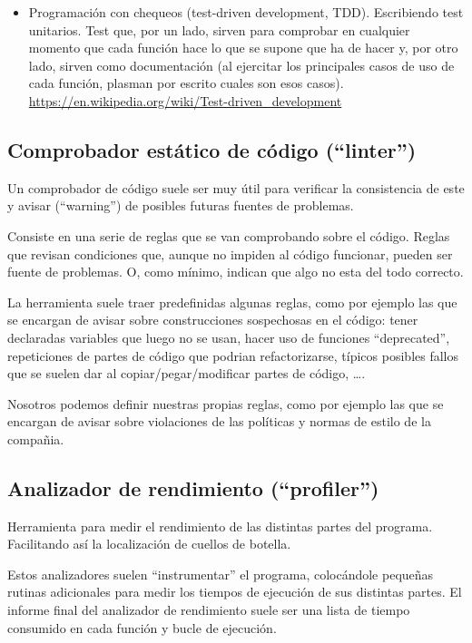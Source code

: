 \documentclass[spanish,12pt,a4paper,final,oneside]{book}
\begin{document}
\begin{itemize}
\item Programación con chequeos (test-driven development, TDD). Escribiendo test unitarios. Test que, por un lado, sirven para comprobar en cualquier momento que cada función hace lo que se supone que ha de hacer y, por otro lado, sirven como documentación (al ejercitar los principales casos de uso de cada función, plasman por escrito cuales son esos casos).
\\ \url{https://en.wikipedia.org/wiki/Test-driven_development}

\end{itemize} 


\subsection{Comprobador estático de código (``linter'')}

Un comprobador de código  suele ser muy útil para verificar la consistencia de este y avisar (``warning'') de posibles futuras fuentes de problemas.

Consiste en una serie de reglas que se van comprobando sobre el código. Reglas que revisan condiciones que, aunque no impiden al código funcionar, pueden ser fuente de problemas. O, como mínimo, indican que algo no esta del todo correcto.

La herramienta suele traer predefinidas algunas reglas, como por ejemplo las que se encargan de avisar sobre construcciones sospechosas en el código: tener declaradas variables que luego no se usan, hacer uso de funciones ``deprecated'', repeticiones de partes de código que podrian refactorizarse, típicos posibles fallos que se suelen dar al copiar/pegar/modificar partes de código, \ldots.

Nosotros podemos definir nuestras propias reglas, como por ejemplo las que se encargan de avisar sobre violaciones de las políticas y normas de estilo de la compañia.


\subsection{Analizador de rendimiento (``profiler'')}
Herramienta para medir el rendimiento de las distintas partes del programa. Facilitando así la localización de cuellos de botella.

Estos analizadores suelen ``instrumentar'' el programa, colocándole pequeñas rutinas adicionales para medir los tiempos de ejecución de sus distintas partes. El informe final del analizador de rendimiento suele ser una lista de tiempo consumido en cada función y bucle de ejecución.
\end{document}
